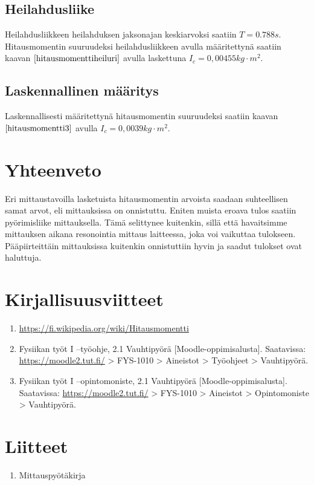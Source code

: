 \documentclass[]{article}
\providecommand{\tightlist}{%
  \setlength{\itemsep}{0pt}\setlength{\parskip}{0pt}}
\begin{document}
\subsection{Heilahdusliike}\label{heilahdusliike-2}

Heilahdusliikkeen heilahduksen jaksonajan keskiarvoksi saatiin
\(T=0.788s\).\\
Hitausmomentin suuruudeksi heilahdusliikkeen avulla määritettynä saatiin
kaavan \(\eqref{hitausmomenttiheiluri}\) avulla laskettuna
\(I_c = 0,00455kg\cdot m^2\).

\subsection{Laskennallinen määritys}\label{laskennallinen-maaritys-2}

Laskennallisesti määritettynä hitausmomentin suuruudeksi saatiin kaavan
\(\eqref{hitausmomentti3}\) avulla \(I_c = 0,0039kg\cdot m^2\).

\section{Yhteenveto}\label{yhteenveto}

Eri mittaustavoilla lasketuista hitausmomentin arvoista saadaan
suhteellisen samat arvot, eli mittauksissa on onnistuttu. Eniten muista
eroava tulos saatiin pyörimisliike mittauksella. Tämä selittynee
kuitenkin, sillä että havaitsimme mittauksen aikana resonointia mittaus
laitteessa, joka voi vaikuttaa tulokseen. Pääpiirteittäin mittauksissa
kuitenkin onnistuttiin hyvin ja saadut tulokset ovat haluttuja.

\section{Kirjallisuusviitteet}\label{kirjallisuusviitteet}

\begin{enumerate}
\def\labelenumi{\arabic{enumi}.}
\tightlist
\item
  \url{https://fi.wikipedia.org/wiki/Hitausmomentti}
\item
  Fysiikan työt I --työohje, 2.1 Vauhtipyörä {[}Moodle-oppimisalusta{]}.
  Saatavissa: \url{https://moodle2.tut.fi/} \textgreater{} FYS-1010
  \textgreater{} Aineistot \textgreater{} Työohjeet \textgreater{}
  Vauhtipyörä.
\item
  Fysiikan työt I --opintomoniste, 2.1 Vauhtipyörä
  {[}Moodle-oppimisalusta{]}. Saatavissa: \url{https://moodle2.tut.fi/}
  \textgreater{} FYS-1010 \textgreater{} Aineistot \textgreater{}
  Opintomoniste \textgreater{} Vauhtipyörä.
\end{enumerate}

\section{Liitteet}\label{liitteet}

\begin{enumerate}
\def\labelenumi{\arabic{enumi}.}
\tightlist
\item
  Mittauspyötäkirja
\end{enumerate}
\newpage 
\end{document}
